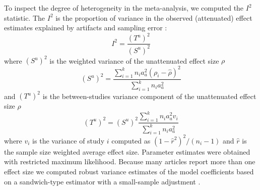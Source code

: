 To inspect the degree of heterogeneity in the meta-analysis, we computed the $I^2$ statistic. The $I^2$ is the proportion of variance in the observed (attenuated) effect estimates explained by artifacts and sampling error \citep{borenstein2011introduction}: 
%
\begin{equation}
\label{eq:i2_statistic}
I^2 = \frac{(T^u)^2}{(S^u)^2}
\end{equation}
%
where $(S^u)^2$ is the weighted variance of the unattenuated effect size $\rho$
%
\begin{equation}
\label{eq:Su2_var}
(S^u)^2 = \frac{\sum_{i=1}^k n_i a_a^2 (\rho_i - \hat{\rho})^2}{\sum_{i=1}^k n_i a_a^2}
\end{equation}
%
and $(T^u)^2$ is the between-studies variance component of the unattenuated effect size $\rho$
%
\begin{equation}
\label{eq:Tu2_var}
(T^u)^2 = (S^u)^2 \frac{\sum_{i=1}^k n_i a_a^2 v_i}{\sum_{i=1}^k n_i a_a^2}
\end{equation}
%
where $v_i$ is the variance of study $i$ computed as $(1 - \hat{r}^2)^2 / (n_i - 1)$ and $\hat{r}$ is the sample size weighted average effect size. Parameter estimates were obtained with restricted maximum likelihood. Because many articles report more than one effect size we computed robust variance estimates of the model coefficients based on a sandwich-type estimator with a small-sample adjustment \citep{hedges2010}.


